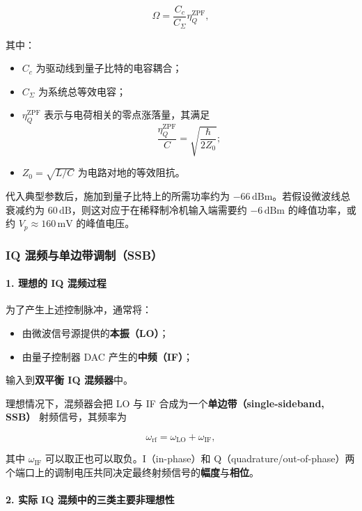\documentclass[12pt,a4paper,oneside]{ctexbook}
\begin{document}
\begin{equation}
    \Omega
    =
    \frac{C_c}{C_\Sigma}\eta_Q^{\mathrm{ZPF}},
    \tag{50}
\end{equation}

其中：

\begin{itemize}
    \item $C_c$ 为驱动线到量子比特的电容耦合；
    \item $C_\Sigma$ 为系统总等效电容；
    \item $\eta_Q^{\mathrm{ZPF}}$ 表示与电荷相关的零点涨落量，其满足
    \[
    \frac{\eta_Q^{\mathrm{ZPF}}}{C} = \sqrt{\frac{\hbar}{2Z_0}};
    \]
    \item $Z_0=\sqrt{L/C}$ 为电路对地的等效阻抗。
\end{itemize}

代入典型参数后，施加到量子比特上的所需功率约为 $-66\,\mathrm{dBm}$。若假设微波线总衰减约为 $60\,\mathrm{dB}$，则这对应于在稀释制冷机输入端需要约 $-6\,\mathrm{dBm}$ 的峰值功率，或约 $V_p \approx 160\,\mathrm{mV}$ 的峰值电压。

\subsubsection{IQ 混频与单边带调制（SSB）}

\paragraph{1. 理想的 IQ 混频过程}

为了产生上述控制脉冲，通常将：

\begin{itemize}
    \item 由微波信号源提供的\textbf{本振（LO）}；
    \item 由量子控制器 DAC 产生的\textbf{中频（IF）}；
\end{itemize}

输入到\textbf{双平衡 IQ 混频器}中。

理想情况下，混频器会把 LO 与 IF 合成为一个\textbf{单边带（single-sideband, SSB）} 射频信号，其频率为

\[
\omega_{\mathrm{rf}} = \omega_{\mathrm{LO}} + \omega_{\mathrm{IF}},
\]

其中 $\omega_{\mathrm{IF}}$ 可以取正也可以取负。I（in-phase）和 Q（quadrature/out-of-phase）两个端口上的调制电压共同决定最终射频信号的\textbf{幅度}与\textbf{相位}。

\paragraph{2. 实际 IQ 混频中的三类主要非理想性}
\end{document}
